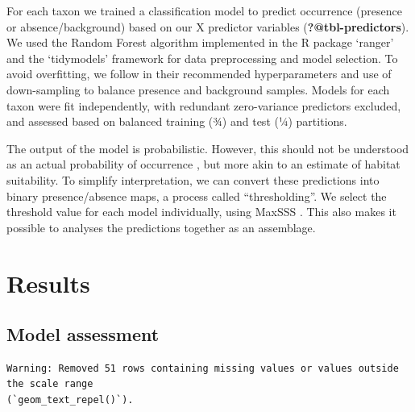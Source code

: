 \documentclass[
  authoryear,
  review]{elsarticle}
\begin{document}
For each taxon we trained a classification model to predict occurrence
(presence or absence/background) based on our X predictor variables
(\textbf{?@tbl-predictors}). We used the Random Forest algorithm
implemented in the R package `ranger' \citep{WrightZiegler2017} and the
`tidymodels' \citep{tidymodels} framework for data preprocessing and
model selection. To avoid overfitting, we follow \citet{ValaviEtAl2021}
in their recommended hyperparameters and use of down-sampling to balance
presence and background samples. Models for each taxon were fit
independently, with redundant zero-variance predictors excluded, and
assessed based on balanced training (¾) and test (¼) partitions.

The output of the model is probabilistic. However, this should not be
understood as an actual probability of occurrence \citep{CITE}, but more
akin to an estimate of habitat suitability. To simplify interpretation,
we can convert these predictions into binary presence/absence maps, a
process called ``thresholding''. We select the threshold value for each
model individually, using MaxSSS \citep[as recommended
by][]{LiuEtAl2013}. This also makes it possible to analyses the
predictions together as an assemblage.

\section{Results}\label{results}

\subsection{Model assessment}\label{model-assessment}

\begin{verbatim}
Warning: Removed 51 rows containing missing values or values outside the scale range
(`geom_text_repel()`).
\end{verbatim}
\end{document}
